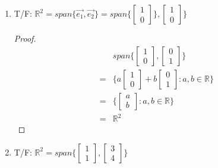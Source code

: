 \documentclass[11pt]{article}
\theoremstyle{plain}
\theoremstyle{remark}
\theoremstyle{plain}
\newcommand{\rn}{\mathbb{R}}
\begin{document}
\begin{tcolorbox}[colback=magenta!5!white,colframe=magenta!75!black,title=Problem 4]
   \begin{enumerate}
       \item T/F: $\rn^2=span\{\overrightarrow{e_1}, \overrightarrow{e_2}\}=span \{\begin{bmatrix}
           1\\0
       \end{bmatrix}\}, \begin{bmatrix}
           1\\0
       \end{bmatrix}\}$

       \begin{proof}
           \begin{align*}
               &span\{\begin{bmatrix}
                   1\\0
               \end{bmatrix}, \begin{bmatrix}
                   0\\1
               \end{bmatrix}\}\\
               =&\{a\begin{bmatrix}
                   1\\0
               \end{bmatrix}+b\begin{bmatrix}
                   0\\1
               \end{bmatrix}:a,b\in\rn\}\\
               =&\{\begin{bmatrix}
                   a\\b
               \end{bmatrix}:a,b\in\rn\}\\
               =&\rn^2
           \end{align*}
       \end{proof}

       \item T/F: $\rn^2=span\{\begin{bmatrix}
           1\\1
       \end{bmatrix}, \begin{bmatrix}
           3\\4
       \end{bmatrix}\}$
   \end{enumerate}
\end{tcolorbox}   
\end{document}
